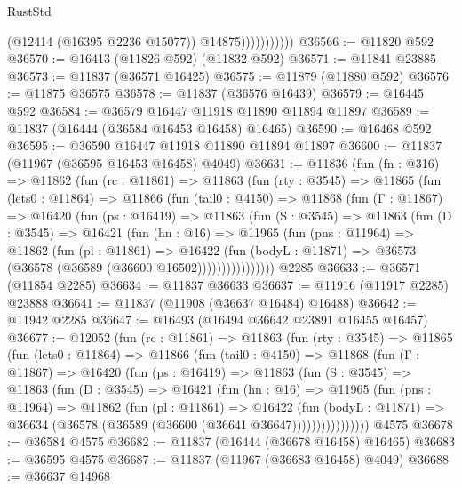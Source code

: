\begin{lexlean}{RustStd}
\begin{coremodule}
                          (@12414 (@16395 @2236 @15077))
                          @14875)))))))))))
@36566 := @11820 @592
@36570 := @16413 (@11826 @592) (@11832 @592)
@36571 := @11841 @23885
@36573 := @11837 (@36571 @16425)
@36575 := @11879 (@11880 @592)
@36576 := @11875 @36575
@36578 := @11837 (@36576 @16439)
@36579 := @16445 @592
@36584 := @36579 @16447 @11918 @11890 @11894 @11897
@36589 := @11837 (@16444 (@36584 @16453 @16458) @16465)
@36590 := @16468 @592
@36595 := @36590 @16447 @11918 @11890 @11894 @11897
@36600 := @11837 (@11967 (@36595 @16453 @16458) @4049)
@36631 := @11836
    (fun (fn : @316) =>
    @11862
      (fun (rc : @11861) =>
      @11863
        (fun (rty : @3545) =>
        @11865
          (fun (lets0 : @11864) =>
          @11866
            (fun (tail0 : @4150) =>
            @11868
              (fun (Γ : @11867) =>
              @16420
                (fun (ps : @16419) =>
                @11863
                  (fun (S : @3545) =>
                  @11863
                    (fun (D : @3545) =>
                    @16421
                      (fun (hn : @16) =>
                      @11965
                        (fun (pns : @11964) =>
                        @11862
                          (fun (pl : @11861) =>
                          @16422
                            (fun (bodyL : @11871) =>
                            @36573 (@36578 (@36589 (@36600 @16502))))))))))))))))
    @2285
@36633 := @36571 (@11854 @2285)
@36634 := @11837 @36633
@36637 := @11916 (@11917 @2285) @23888
@36641 := @11837 (@11908 (@36637 @16484) @16488)
@36642 := @11942 @2285
@36647 := @16493 (@16494 @36642 @23891 @16455 @16457)
@36677 := @12052
    (fun (rc : @11861) =>
    @11863
      (fun (rty : @3545) =>
      @11865
        (fun (lets0 : @11864) =>
        @11866
          (fun (tail0 : @4150) =>
          @11868
            (fun (Γ : @11867) =>
            @16420
              (fun (ps : @16419) =>
              @11863
                (fun (S : @3545) =>
                @11863
                  (fun (D : @3545) =>
                  @16421
                    (fun (hn : @16) =>
                    @11965
                      (fun (pns : @11964) =>
                      @11862
                        (fun (pl : @11861) =>
                        @16422
                          (fun (bodyL : @11871) =>
                          @36634 (@36578 (@36589 (@36600 (@36641 @36647))))))))))))))))
    @4575
@36678 := @36584 @4575
@36682 := @11837 (@16444 (@36678 @16458) @16465)
@36683 := @36595 @4575
@36687 := @11837 (@11967 (@36683 @16458) @4049)
@36688 := @36637 @14968

\end{coremodule}
\end{lexlean}

